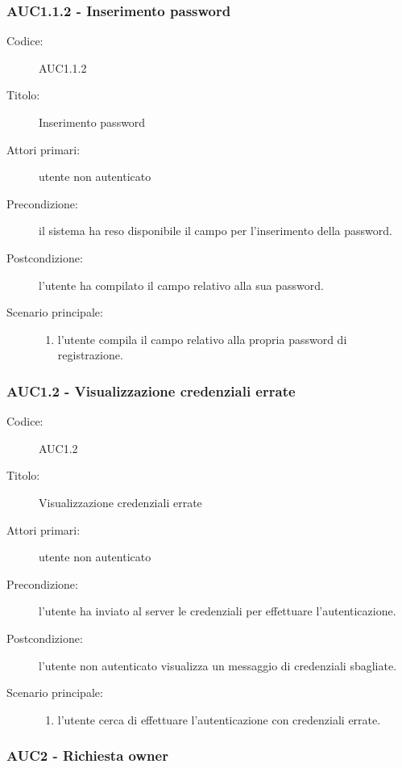 \documentclass[../analisi-dei-requisiti.tex]{subfiles}
\begin{document}
\subsubsection{AUC1.1.2 - Inserimento password}%
\label{subsub:AUC1.1.2}
\begin{description}
  \item[Codice:] AUC1.1.2
  \item[Titolo:] Inserimento password
  \item[Attori primari:] utente non autenticato
  \item[Precondizione:] il sistema ha reso disponibile il campo per l'inserimento della password.
  \item[Postcondizione:] l'utente ha compilato il campo relativo alla sua password.
  \item[Scenario principale:]
  \begin{enumerate}
    \item l'utente compila il campo relativo alla propria password di registrazione.
  \end{enumerate}
\end{description}

\subsubsection{AUC1.2 - Visualizzazione credenziali errate}%
\label{subsub:AUC1.2}
\begin{description}
  \item[Codice:] AUC1.2
  \item[Titolo:] Visualizzazione credenziali errate
  \item[Attori primari:] utente non autenticato
  \item[Precondizione:] l'utente ha inviato al server le credenziali per effettuare l'autenticazione.
  \item[Postcondizione:] l'utente non autenticato visualizza un messaggio di credenziali sbagliate.
  \item[Scenario principale:]
  \begin{enumerate}
    \item l'utente cerca di effettuare l'autenticazione con credenziali errate.
  \end{enumerate}
\end{description}

\subsubsection{AUC2 - Richiesta owner}%
\label{subsub:AUC2}
\end{document}
